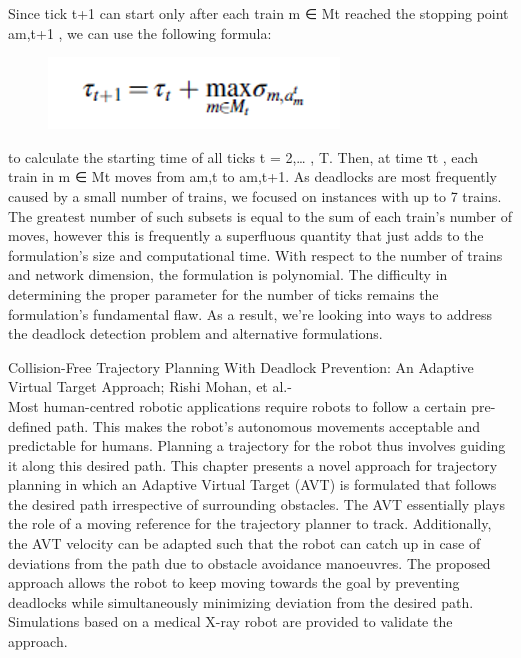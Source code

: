 \documentclass[sigplan,screen]{acmart}
\begin{document}
\begin{itemize}
Since tick t+1 can start only after each train m ∈ Mt reached the stopping point am,t+1 , we can use the following formula:
 \begin{figure}[h]
    \centering
    \includegraphics[width=\linewidth]{7.png}
\end{figure}
\end{itemize}
to calculate the starting time of all ticks t = 2,… , T. Then, at time τt , each train in m ∈ Mt moves from am,t to am,t+1. As deadlocks are most frequently caused by a small number of trains, we focused on instances with up to 7 trains.
The greatest number of such subsets is equal to the sum of each train's number of moves, however this is frequently a superfluous quantity that just adds to the formulation's size and computational time. With respect to the number of trains and network dimension, the formulation is polynomial. The difficulty in determining the proper parameter for the number of ticks remains the formulation's fundamental flaw. As a result, we're looking into ways to address the deadlock detection problem and alternative formulations.
\par
Collision-Free Trajectory Planning With Deadlock Prevention: An Adaptive Virtual Target Approach; Rishi Mohan, et al.-
\\
Most human-centred robotic applications require robots to follow a certain pre-defined path. This makes the robot's autonomous movements acceptable and predictable for humans. Planning a trajectory for the robot thus involves guiding it along this desired path. 
This chapter presents a novel approach for trajectory planning in which an Adaptive Virtual Target (AVT) is formulated that follows the desired path irrespective of surrounding obstacles. The AVT essentially plays the role of a moving reference for the trajectory planner to track. Additionally, the AVT velocity can be adapted such that the robot can catch up in case of deviations from the path due to obstacle avoidance manoeuvres.
The proposed approach allows the robot to keep moving towards the goal by preventing deadlocks while simultaneously minimizing deviation from the desired path. Simulations based on a medical X-ray robot are provided to validate the approach.
\end{document}
